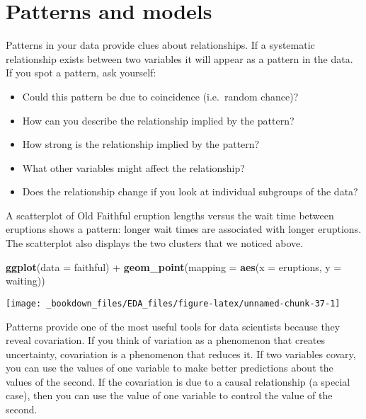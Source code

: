 \documentclass[]{book}
\newenvironment{Shaded}{\begin{snugshade}}{\end{snugshade}}
\newcommand{\KeywordTok}[1]{\textcolor[rgb]{0.13,0.29,0.53}{\textbf{{#1}}}}
\newcommand{\DataTypeTok}[1]{\textcolor[rgb]{0.13,0.29,0.53}{{#1}}}
\newcommand{\StringTok}[1]{\textcolor[rgb]{0.31,0.60,0.02}{{#1}}}
\newcommand{\NormalTok}[1]{{#1}}
\begin{document}
\section{Patterns and models}\label{patterns-and-models}

Patterns in your data provide clues about relationships. If a systematic
relationship exists between two variables it will appear as a pattern in
the data. If you spot a pattern, ask yourself:

\begin{itemize}
\item
  Could this pattern be due to coincidence (i.e.~random chance)?
\item
  How can you describe the relationship implied by the pattern?
\item
  How strong is the relationship implied by the pattern?
\item
  What other variables might affect the relationship?
\item
  Does the relationship change if you look at individual subgroups of
  the data?
\end{itemize}

A scatterplot of Old Faithful eruption lengths versus the wait time
between eruptions shows a pattern: longer wait times are associated with
longer eruptions. The scatterplot also displays the two clusters that we
noticed above.

\begin{Shaded}
\begin{Highlighting}[]
\KeywordTok{ggplot}\NormalTok{(}\DataTypeTok{data =} \NormalTok{faithful) +}\StringTok{ }
\StringTok{  }\KeywordTok{geom_point}\NormalTok{(}\DataTypeTok{mapping =} \KeywordTok{aes}\NormalTok{(}\DataTypeTok{x =} \NormalTok{eruptions, }\DataTypeTok{y =} \NormalTok{waiting))}
\end{Highlighting}
\end{Shaded}

\begin{center}\texttt{[image: \_bookdown\_files/EDA\_files/figure-latex/unnamed-chunk-37-1]} \end{center}

Patterns provide one of the most useful tools for data scientists
because they reveal covariation. If you think of variation as a
phenomenon that creates uncertainty, covariation is a phenomenon that
reduces it. If two variables covary, you can use the values of one
variable to make better predictions about the values of the second. If
the covariation is due to a causal relationship (a special case), then
you can use the value of one variable to control the value of the
second.
\end{document}
